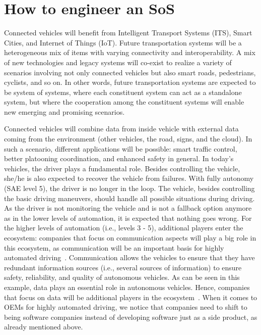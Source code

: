\section{How to engineer an SoS}

Connected vehicles will benefit from Intelligent Transport Systems (ITS), Smart
Cities, and Internet of Things (IoT). 
Future transportation systems will be a heterogeneous mix of items with varying connectivity and interoperability. A mix of new technologies and legacy systems will co-exist to realize a variety of scenarios involving not only connected vehicles but also smart roads, pedestrians, cyclists, and so on. In other words, future transportation systems are expected to be system of systems, where each constituent system can act as a standalone system, but where the cooperation among the constituent systems will enable new emerging and promising scenarios. 


Connected vehicles  will combine data from inside vehicle
with external data coming from the environment (other vehicles, the road, signs,
and the cloud). In such a scenario, different applications will be possible: smart
traffic control, better platooning coordination, and enhanced safety in general.
In today's vehicles, the driver plays a fundamental role. Besides controlling
the vehicle, she/he is also expected to recover the vehicle from failures. With fully
autonomy (SAE level 5), the driver is no longer in the loop. The vehicle, besides
controlling the basic driving maneuvers, should handle all possible situations during
driving. As the driver is not monitoring the vehicle and is not a fallback option
anymore as in the lower levels of automation, it is expected that nothing goes wrong.
For the higher levels of automation (i.e., levels 3 - 5), additional players enter the
ecosystem: companies that focus on communication aspects will play a big role in
this ecosystem, as communication will be an important basis for highly automated
driving~\cite{Knauss2017challenges}. Communication allows the vehicles to ensure that they have redundant
information sources (i.e., several sources of information) to ensure safety, reliability,
and quality of autonomous vehicles. As can be seen in this example, data plays an
essential role in autonomous vehicles. Hence, companies that focus on data will be
additional players in the ecosystem~\cite{Knauss2017challenges}. When it comes to OEMs for highly automated
driving, we notice that companies need to shift to being software companies
instead of developing software just as a side product, as already mentioned above.



